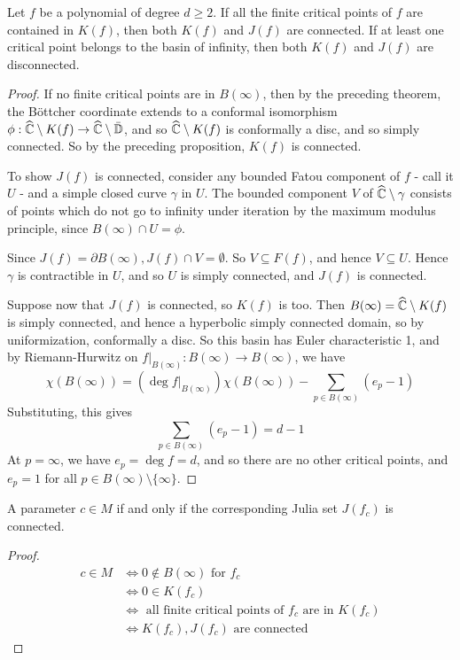 \documentclass[10pt,a4paper]{article}
\begin{document}
\begin{proposition}
  Let $f$ be a polynomial of degree $d \geq 2$. If all the finite critical points of $f$ are contained in $K(f)$, then both $K(f)$ and $J(f)$ are connected. If at least one critical point belongs to the basin of infinity, then both $K(f)$ and $J(f)$ are disconnected.
\end{proposition}
\begin{proof}
  If no finite critical points are in $B(\infty)$, then by the preceding theorem, the B\"ottcher coordinate extends to a conformal isomorphism $\phi: \widehat{\mathbb{C}}\setminus K(f) \to \widehat{\mathbb{C}}\setminus \bar{\mathbb{D}}$, and so $\widehat{\mathbb{C}}\setminus K(f)$ is conformally a disc, and so simply connected. So by the preceding proposition, $K(f)$ is connected.

  To show $J(f)$ is connected, consider any bounded Fatou component of $f$ - call it $U$ - and a simple closed curve $\gamma$ in $U$. The bounded component $V$ of $\widehat{\mathbb{C}}\setminus\gamma$ consists of points which do not go to infinity under iteration by the maximum modulus principle, since $B(\infty) \cap U = \phi$.

  Since $J(f) = \partial B(\infty), J(f)\cap V = \emptyset$. So $V \subseteq F(f)$, and hence $V \subseteq U$. Hence $\gamma$ is contractible in $U$, and so $U$ is simply connected, and $J(f)$ is connected.

  Suppose now that $J(f)$ is connected, so $K(f)$ is too. Then $B(\infty) = \widehat{\mathbb{C}} \setminus K(f)$ is simply connected, and hence a hyperbolic simply connected domain, so by uniformization, conformally a disc. So this basin has Euler characteristic 1, and by Riemann-Hurwitz on $f|_{B(\infty)} : B(\infty) \to B(\infty)$, we have
  \[\chi(B(\infty)) = (\deg f|_{B(\infty)})\chi(B(\infty)) - \sum_{p\in B(\infty)} (e_p - 1)\]
  Substituting, this gives
  \[\sum_{p \in B(\infty)} (e_p-1) = d-1\]
  At $p = \infty$, we have $e_p = \deg f = d$, and so there are no other critical points, and $e_p = 1$ for all $p \in B(\infty)\setminus \{\infty\}$.
\end{proof}
\begin{corollary}
  A parameter $c \in M$ if and only if the corresponding Julia set $J(f_c)$ is connected.
\end{corollary}
\begin{proof}
  \begin{align*}
    c \in M &\iff 0 \notin B(\infty) \text{ for }f_c\\
    &\iff 0 \in K(f_c)\\
    &\iff \text{ all finite critical points of $f_c$ are in $K(f_c)$}\\
    &\iff K(f_c), J(f_c) \text{ are connected}
  \end{align*}
\end{proof}
\end{document}

